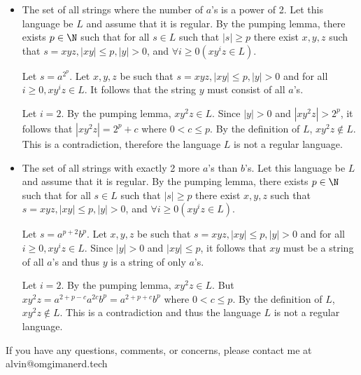 \documentclass{math}
\begin{document}
\begin{itemize}
  \item The set of all strings where the number of \( a \)'s is a power of 2.
  Let this language be \( L \) and assume that it is regular. By the pumping
  lemma, there exists \( p\in\N \) such that for all \( s\in L \) such that
  \( |s|\ge p \) there exist \( x,y,z \) such that \( s = xyz, |xy|\le p, |y|>0
  \), and \( \forall{i}\ge0(xy^iz\in L) \). \par
  Let \( s = a^{2^p} \). Let \( x,y,z \) be such that
  \( s = xyz, |xy|\le p, |y|>0 \) and for all \( i\ge0, xy^iz\in L \). It
  follows that the string \( y \) must consist of all \( a \)'s. \par
  Let \( i = 2 \). By the pumping lemma, \( xy^2z\in L \). Since \( |y|>0 \) and
  \( |xy^2z|>2^p \), it follows that \( |xy^2z| = 2^p+c \) where \( 0<c\le p \).
  By the definition of \( L \), \( xy^2z\notin L \). This is a contradiction,
  therefore the language \( L \) is not a regular language.

  \item The set of all strings with exactly 2 more \( a \)'s than \( b \)'s.
  Let this language be \( L \) and assume that it is regular. By the pumping
  lemma, there exists \( p\in\N \) such that for all \( s\in L \) such that
  \( |s|\ge p \) there exist \( x,y,z \) such that \( s = xyz, |xy|\le p, |y|>0
  \), and \( \forall{i}\ge0(xy^iz\in L) \). \par
  Let \( s = a^{p+2}b^{p} \). Let \( x,y,z \) be such that
  \( s = xyz, |xy|\le p, |y|>0 \) and for all \( i\ge0, xy^iz\in L \). Since
  \( |y|>0 \) and \( |xy|\le p \), it follows that \( xy \) must be a string of
  all \( a \)'s and thus \( y \) is a string of only \( a \)'s. \par
  Let \( i = 2 \). By the pumping lemma, \( xy^2z\in L \). But \( xy^2z =
  a^{2+p-c}a^{2c}b^{p} = a^{2+p+c}b^{p} \) where \( 0<c\le p \). By the
  definition of \( L \), \( xy^2z\notin L \). This is a contradiction and thus
  the language \( L \) is not a regular language.
\end{itemize}

\begin{center}
  If you have any questions, comments, or concerns, please contact me at
  alvin@omgimanerd.tech
\end{center}
\end{document}
